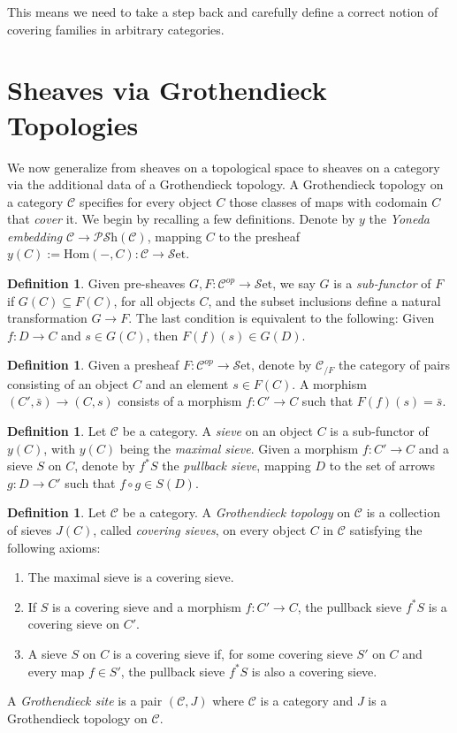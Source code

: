 \documentclass[10pt]{amsart}
\newcommand{\C}{\mathscr{C}}
\newcommand{\Hom}{\mathrm{Hom}}
\newcommand{\set}{\mathscr{S}\mathrm{et}}
\newcommand{\PSh}{\mathscr{P}\mathscr{S}\mathrm{h}}
\theoremstyle{definition}
\newtheorem{definition}[equation]{Definition}
\theoremstyle{remark}
\begin{document}
	This means we need to take a step back and carefully define a correct notion of covering families in arbitrary categories.
	
	\section{Sheaves via Grothendieck Topologies}
	
	We now generalize from sheaves on a topological space to sheaves on a category via the additional data of a Grothendieck topology. A Grothendieck topology on a category $\C$ specifies for every object $C$ those classes of maps with codomain $C$ that \textit{cover} it. We begin by recalling a few definitions. Denote by $y$ the \textit{Yoneda embedding} $\C\to\PSh(\C)$, mapping $C$ to the presheaf $y(C):=\Hom(-,C)\colon\C\to\set$. 
	\begin{definition}
		Given pre-sheaves $G,F\colon\C^{op}\to\set$, we say $G$ is a \textit{sub-functor} of $F$ if $G(C)\subseteq F(C)$, for all objects $C$, and the subset inclusions define a natural transformation $G\to F$. The last condition is equivalent to the following: Given $f\colon D\to C$ and $s\in G(C)$, then $F(f)(s)\in G(D)$. 
	\end{definition}
	\begin{definition}
		Given a presheaf $F\colon\C^{op}\to\set$, denote by $\C_{/F}$ the category of pairs  consisting of an object $C$ and an element $s\in F(C)$. A morphism $(C',\bar s)\to(C,s)$ consists of a morphism $f\colon C'\to C$ such that $F(f)(s)=\bar s$. 
	\end{definition}
	\begin{definition}
		Let $\C$ be a category. A \emph{sieve} on an object $C$ is a sub-functor of $y(C)$, with $y(C)$ being the \textit{maximal sieve}. Given a morphism $f\colon C'\to C$ and a sieve $S$ on $C$, denote by $f^*S$ the \textit{pullback sieve}, mapping $D$ to the set of arrows $g\colon D\to C'$ such that $f\circ g\in S(D)$. 
	\end{definition}
	\begin{definition}
		Let $\C$ be a category. A \emph{Grothendieck topology} on $\C$ is a collection of sieves $J(C)$, called \textit{covering sieves}, on every object $C$ in $\C$ satisfying the following axioms:
		\begin{enumerate}
			\item The maximal sieve is a covering sieve.
			\item If $S$ is a covering sieve and a morphism $f\colon C' \to C$, the pullback sieve $f^*S$ is a covering sieve on $C'$.
			\item A sieve $S$ on $C$ is a covering sieve if, for some covering sieve $S'$ on $C$ and every map $f\in S'$, the pullback sieve $f^*S$ is also a covering sieve. 
		\end{enumerate}
		A \emph{Grothendieck site} is a pair $(\C, J)$ where $\C$ is a category and $J$ is a Grothendieck topology on $\C$.
	\end{definition}
\end{document}
